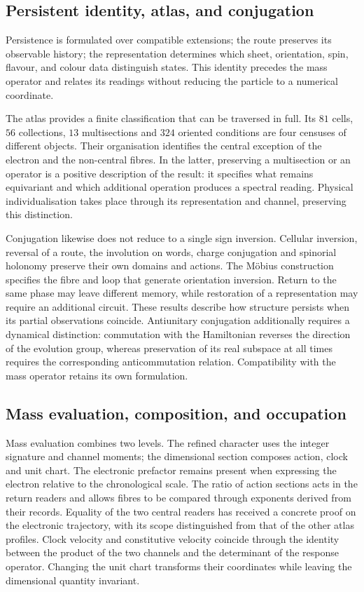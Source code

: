 \subsection{Persistent identity, atlas, and conjugation}

Persistence is formulated over compatible extensions; the route
preserves its observable history; the representation determines which
sheet, orientation, spin, flavour, and colour data distinguish states.
This identity precedes the mass operator and relates its readings without
reducing the particle to a numerical coordinate.

The atlas provides a finite classification that can be traversed
in full. Its \(81\) cells, \(56\) collections, \(13\) multisections and
\(324\) oriented conditions are four censuses of different objects.
Their organisation identifies the central exception of the electron and the
non-central fibres. In the latter, preserving a multisection or an
operator is a positive description of the result: it specifies what remains
equivariant and which additional operation produces a spectral reading.
Physical individualisation takes place through its representation and
channel, preserving this distinction.

Conjugation likewise does not reduce to a single sign inversion.
Cellular inversion, reversal of a route, the involution on
words, charge conjugation and spinorial holonomy preserve
their own domains and actions. The Möbius construction specifies the
fibre and loop that generate orientation inversion. Return to the
same phase may leave different memory, while restoration of a
representation may require an additional circuit. These results
describe how structure persists when its partial observations
coincide.
Antiunitary conjugation additionally requires a dynamical distinction:
commutation with the Hamiltonian reverses the direction of the evolution
group, whereas preservation of its real subspace at all times
requires the corresponding anticommutation relation. Compatibility
with the mass operator retains its own formulation.

\subsection{Mass evaluation, composition, and occupation}

Mass evaluation combines two levels. The refined character uses
the integer signature and channel moments; the dimensional section
composes action, clock and unit chart. The electronic prefactor
remains present when expressing the electron relative to the chronological
scale. The ratio of action sections acts in the return
readers and allows fibres to be compared through exponents derived from
their records. Equality of the two central readers has received
a concrete proof on the electronic trajectory, with its scope
distinguished from that of the other atlas profiles.
Clock velocity and constitutive velocity coincide through
the identity between the product of the two channels and the determinant of the
response operator. Changing the unit chart transforms their
coordinates while leaving the dimensional quantity invariant.

